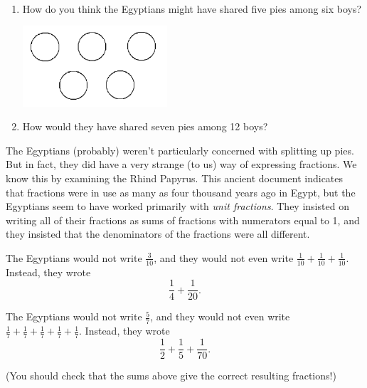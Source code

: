 \begin{thinkpair*}\ 
\begin{enumerate}
\item
How do you think the Egyptians might have shared five pies among six boys?
\begin{center}
\includegraphics[height=3cm]{fivepies}
\end{center}

\item
How would they have shared seven pies among 12 boys?

\end{enumerate}

\end{thinkpair*}

The Egyptians (probably) weren't particularly concerned with splitting up pies.  But in fact, they did have a very strange (to us) way of expressing fractions. We know this by examining the  Rhind Papyrus.  This ancient document indicates that fractions were in use as many as four thousand years ago in Egypt, but the Egyptians seem to have worked primarily with \emph{unit fractions}.  They insisted on writing all of their fractions as sums of fractions with
numerators equal to 1, and they insisted that  the denominators of the fractions were all different.


\begin{example}
The Egyptians would not write $\frac 3{10}$, and they would not even write $\frac 1{10} + \frac 1{10} + \frac 1{10}$.  Instead, they wrote 
\[
\frac 1 4 + \frac 1{20}.
\]


The Egyptians would not write $\frac 5{7}$, and they would not even write $\frac 1{7} + \frac 1{7} + \frac 1{7} + \frac 1{7} + \frac 1{7}$.  Instead, they wrote 
\[
\frac 1 2 + \frac 1 5 + \frac 1{70}.
\]

(You should check that the sums above give the correct resulting fractions!)
\end{example}



